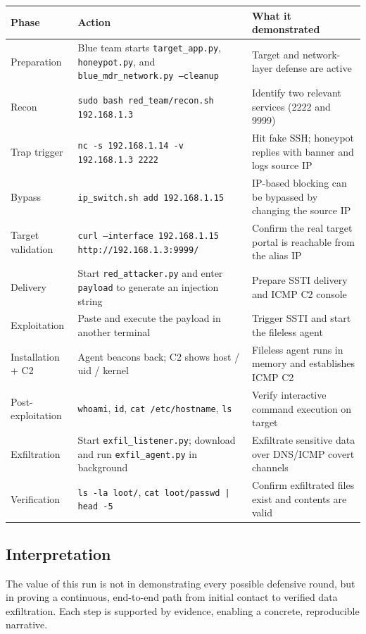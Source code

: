 \documentclass[11pt]{article}
\begin{document}
\begin{longtable}{>{\raggedright\arraybackslash}p{1.7cm} >{\raggedright\arraybackslash}p{5.2cm} >{\raggedright\arraybackslash}p{7.0cm}}
\toprule
Phase & Action & What it demonstrated \\
\midrule
Preparation & Blue team starts \texttt{target\_app.py}, \texttt{honeypot.py}, and \texttt{blue\_mdr\_network.py --cleanup} & Target and network-layer defense are active \\
Recon & \texttt{sudo bash red\_team/recon.sh 192.168.1.3} & Identify two relevant services (2222 and 9999) \\
Trap trigger & \texttt{nc -s 192.168.1.14 -v 192.168.1.3 2222} & Hit fake SSH; honeypot replies with banner and logs source IP \\
Bypass & \texttt{ip\_switch.sh add 192.168.1.15} & IP-based blocking can be bypassed by changing the source IP \\
Target validation & \texttt{curl --interface 192.168.1.15 http://192.168.1.3:9999/} & Confirm the real target portal is reachable from the alias IP \\
Delivery & Start \texttt{red\_attacker.py} and enter \texttt{payload} to generate an injection string & Prepare SSTI delivery and ICMP C2 console \\
Exploitation & Paste and execute the payload in another terminal & Trigger SSTI and start the fileless agent \\
Installation + C2 & Agent beacons back; C2 shows host / uid / kernel & Fileless agent runs in memory and establishes ICMP C2 \\
Post-exploitation & \texttt{whoami}, \texttt{id}, \texttt{cat /etc/hostname}, \texttt{ls} & Verify interactive command execution on target \\
Exfiltration & Start \texttt{exfil\_listener.py}; download and run \texttt{exfil\_agent.py} in background & Exfiltrate sensitive data over DNS/ICMP covert channels \\
Verification & \texttt{ls -la loot/}, \texttt{cat loot/passwd | head -5} & Confirm exfiltrated files exist and contents are valid \\
\bottomrule
\end{longtable}

\subsection{Interpretation}
The value of this run is not in demonstrating every possible defensive round, but in proving a continuous, end-to-end path from initial contact to verified data exfiltration. Each step is supported by evidence, enabling a concrete, reproducible narrative.
\end{document}
